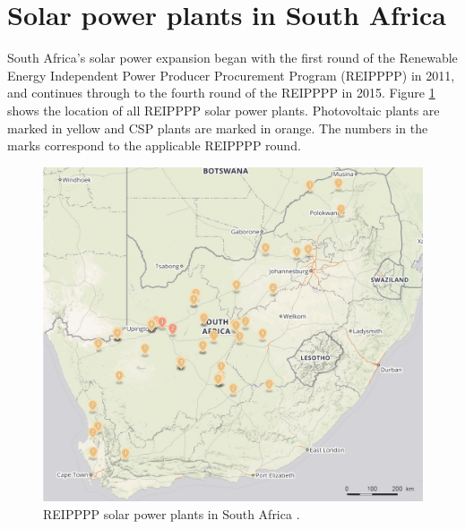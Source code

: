 \section{Solar power plants in South Africa}

South Africa's solar power expansion began with the first round of the Renewable Energy Independent Power Producer Procurement Program (REIPPPP) in 2011, and continues through to the fourth round of the REIPPPP in 2015. Figure \ref{Solar-map} shows the location of all REIPPPP solar power plants. Photovoltaic plants are marked in yellow and CSP plants are marked in orange. The numbers in the marks correspond to the applicable REIPPPP round.

\begin{figure}[h!] %
\centering
\includegraphics[width=1\linewidth]{FIG/Solar-map}
\caption[REIPPPP solar power plants in South Africa.]{REIPPPP solar power plants in South Africa \cite{Forder2015}.}\label{Solar-map}
\end{figure}

